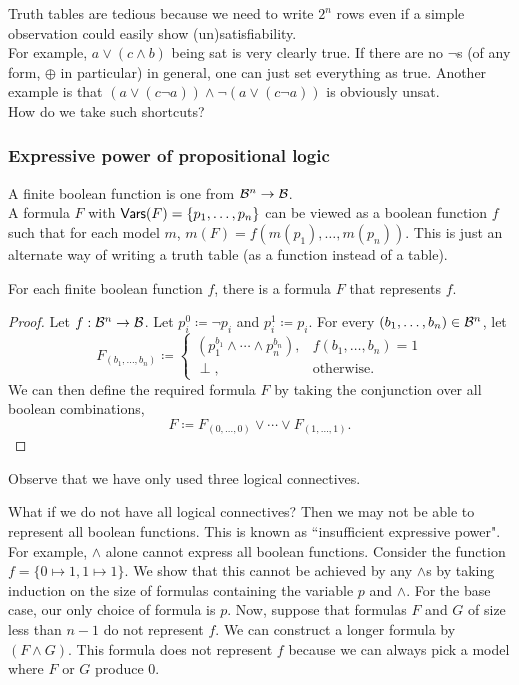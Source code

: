 Truth tables are tedious because we need to write $2^n$ rows even if a simple observation could easily show (un)satisfiability.\\
For example, $a \vee (c \wedge b)$ being sat is very clearly true. If there are no $\neg$s (of any form, $\oplus$ in particular) in general, one can just set everything as true. Another example is that $(a \vee (c \neg a))\wedge\neg (a \vee (c \neg a))$ is obviously unsat.\\
How do we take such shortcuts?

\subsubsection{Expressive power of propositional logic}

A finite boolean function is one from $\mathcal{B}^n\to\mathcal{B}$.\\
A formula $F$ with $\mathsf{Vars}(F)=\{p_1,\ldots,p_n\}$ can be viewed as a boolean function $f$ such that for each model $m$, $m(F)=f(m(p_1),\ldots,m(p_n))$. This is just an alternate way of writing a truth table (as a function instead of a table).

\begin{theorem}
For each finite boolean function $f$, there is a formula $F$ that represents $f$.
\end{theorem}
\begin{proof}
Let $f:\mathcal{B}^n\to\mathcal{B}$. Let $p_i^0\coloneqq\neg p_i$ and $p_i^1\coloneqq p_i$. For every $(b_1,\ldots,b_n)\in\mathcal{B}^n$, let
\[
    F_{(b_1,\ldots,b_n)} \coloneqq
    \begin{cases}
        (p_1^{b_1}\wedge\cdots\wedge p_n^{b_n}), & f(b_1,\ldots,b_n)=1 \\
        \perp, & \text{otherwise.}
    \end{cases}
\]
We can then define the required formula $F$ by taking the conjunction over all boolean combinations,
\[ F \coloneqq F_{(0,\ldots,0)} \vee \cdots \vee F_{(1,\ldots,1)}. \]
\end{proof}

Observe that we have only used three logical connectives.

What if we do not have all logical connectives? Then we may not be able to represent all boolean functions. This is known as ``insufficient expressive power".\\

For example, $\wedge$ alone cannot express all boolean functions. Consider the function $f=\{0\mapsto 1, 1\mapsto 1\}$. We show that this cannot be achieved by any $\wedge$s by taking induction on the size of formulas containing the variable $p$ and $\wedge$. For the base case, our only choice of formula is $p$. Now, suppose that formulas $F$ and $G$ of size less than $n-1$ do not represent $f$. We can construct a longer formula by $(F\wedge G)$. This formula does not represent $f$ because we can always pick a model where $F$ or $G$ produce $0$.

